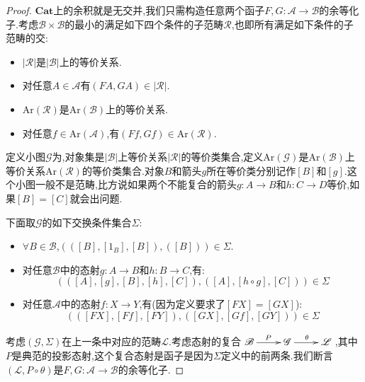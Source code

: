 \begin{enumerate}
\begin{proof}
    	$\textbf{Cat}$上的余积就是无交并,我们只需构造任意两个函子$F,G:\mathscr{A}\to\mathscr{B}$的余等化子.考虑$\mathscr{B}\times\mathscr{B}$的最小的满足如下四个条件的子范畴$\mathscr{R}$,也即所有满足如下条件的子范畴的交:
    	\begin{itemize}
    		\item $|\mathscr{R}|$是$|\mathscr{B}|$上的等价关系.
    		\item 对任意$A\in\mathscr{A}$有$(FA,GA)\in|\mathscr{R}|$.
    		\item $\mathrm{Ar}(\mathscr{R})$是$\mathrm{Ar}(\mathscr{B})$上的等价关系.
    		\item 对任意$f\in\mathrm{Ar}(\mathscr{A})$,有$(Ff,Gf)\in\mathrm{Ar}(\mathscr{R})$.
    	\end{itemize}
    
        定义小图$\mathscr{G}$为,对象集是$|\mathscr{B}|$上等价关系$|\mathscr{R}|$的等价类集合,定义$\mathrm{Ar}(\mathscr{G})$是$\mathrm{Ar}(\mathscr{B})$上等价关系$\mathrm{Ar}(\mathscr{R})$的等价类集合.对象$B$和箭头$g$所在等价类分别记作$[B]$和$[g]$.这个小图一般不是范畴,比方说如果两个不能复合的箭头$g:A\to B$和$h:C\to D$等价,如果$[B]=[C]$就会出问题.
        
        \qquad
        
        下面取$\mathscr{G}$的如下交换条件集合$\Sigma$:
        \begin{itemize}
        	\item $\forall B\in\mathscr{B}$,$(([B],[1_B],[B]),([B]))\in\Sigma$.
        	\item 对任意$\mathscr{B}$中的态射$g:A\to B$和$h:B\to C$,有:
        	$$\left(([A],[g],[B],[h],[C]),([A],[h\circ g],[C])\right)\in\Sigma$$
        	\item 对任意$\mathscr{A}$中的态射$f:X\to Y$,有(因为定义要求了$[FX]=[GX]$):
        	$$\left(([FX],[Ff],[FY]),([GX],[Gf],[GY])\right)\in\Sigma$$
        \end{itemize}
        
        考虑$(\mathscr{G},\Sigma)$在上一条中对应的范畴$\mathscr{L}$.考虑态射的复合$\xymatrix{\mathscr{B}\ar[r]^{P}&\mathscr{G}\ar[r]^{\theta}&\mathscr{L}}$,其中$P$是典范的投影态射,这个复合态射是函子是因为$\Sigma$定义中的前两条.我们断言$(\mathscr{L},P\circ\theta)$是$F,G:\mathscr{A}\to\mathscr{B}$的余等化子.
        
        \qquad
        

\end{proof}
\end{enumerate}
